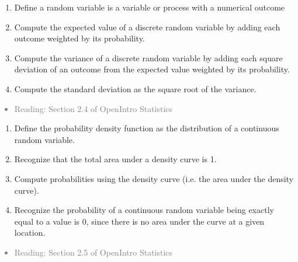 \documentclass[11pt]{article}
\newcommand{\gray}[1]{\textcolor{gray}{#1}}
\begin{document}
\vspace{0.25cm}

%

\begin{enumerate}[resume]
\renewcommand\labelenumi{\textcolor{light}{\textbf{LO \theenumi.}}}

\item Define a random variable is a variable or process with a numerical outcome
\item Compute the expected value of a discrete random variable by adding each outcome weighted by its probability.
\item Compute the variance of a discrete random variable by adding each square deviation of an outcome from the expected value weighted by its probability.
\item Compute the standard deviation as the square root of the variance.
\end{enumerate}
\gray{
{\it
\vspace{-0.75cm}
\begin{itemize}
\renewcommand{\labelitemi}{{\textcolor{dark}{$\ast$}}}
\item Reading: Section 2.4 of OpenIntro Statistics
\end{itemize}
}}

\vspace{0.25cm}

%

\begin{enumerate}[resume]
\renewcommand\labelenumi{\textcolor{light}{\textbf{LO \theenumi.}}}

\item Define the probability density function as the distribution of a continuous random variable. 
\item Recognize that the total area under a density curve is 1.
\item Compute probabilities using the density curve (i.e. the area under the density curve).
\item Recognize the probability of a continuous random variable being exactly equal to a value is 0, since there is no area under the curve at a given location.
\end{enumerate}
\gray{
{\it
\vspace{-0.75cm}
\begin{itemize}
\renewcommand{\labelitemi}{{\textcolor{dark}{$\ast$}}}
\item Reading: Section 2.5 of OpenIntro Statistics
\end{itemize}
}}
\end{document}
